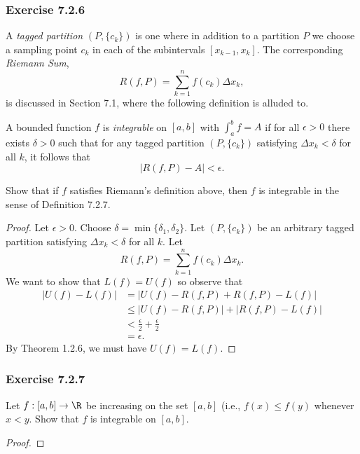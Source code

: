 \subsubsection{Exercise 7.2.6} A \textit{tagged partition} \( (P, \{ c_{k } \} ) \) is one where in addition to a partition \( P  \) we choose a sampling point \( c_{k } \) in each of the subintervals \( [ x_{k-1} , x_{k }]  \). The corresponding \textit{Riemann Sum}, 
\[  R(f, P ) = \sum_{ k=1 }^{ n } f(c_{k }) \Delta x_{k },  \] is discussed in Section 7.1, where the following definition is alluded to. 
\begin{tcolorbox}
	\begin{defn}
	A bounded function \( f  \) is \textit{integrable} on \( [a,b]  \) with \( \int_{ a }^{ b } f = A  \) if for all \( \epsilon > 0   \) there exists \( \delta > 0  \) such that for any tagged partition \( (P, \{ c_{k } \} ) \) satisfying \( \Delta x_{k } < \delta  \) for all \( k  \), it follows that 
	\[  | R(f,P) - A  | < \epsilon. \]
	\end{defn}
\end{tcolorbox}

Show that if \( f  \) satisfies Riemann's definition above, then \( f  \) is integrable in the sense of Definition 7.2.7.

\begin{proof}
Let \( \epsilon > 0  \). Choose \( \delta = \min \{ \delta_1  , \delta_2  \}  \). Let \( (P, \{ c_{k} \} ) \) be an arbitrary tagged partition satisfying \( \Delta x_{k } < \delta  \) for all \( k  \). Let 
\[ R(f, P) = \sum_{ k=1 }^{ n } f(c_{k }) \Delta x_{k }.  \]
We want to show that \( L(f) = U(f)  \) so observe that 
\begin{align*}
    | U(f) - L(f)  | &= | U(f) - R(f,P) + R(f,P) - L(f)   |  \\
					 &\leq | U(f) - R(f,P)  | + | R(f,P) - L(f)  | \\
					 &< \frac{ \epsilon  }{ 2 }  + \frac{ \epsilon  }{ 2 } \\
					 &= \epsilon.
\end{align*}
By Theorem 1.2.6, we must have \( U(f) = L(f) \).
\end{proof}

\subsubsection{Exercise 7.2.7}  Let \( f: [a,b] \to \R   \) be increasing on the set \( [a,b]  \) (i.e., \( f(x) \leq f(y) \) whenever \( x < y  \). Show that \( f  \) is integrable on \( [a,b]  \).
\begin{proof}

\end{proof}






